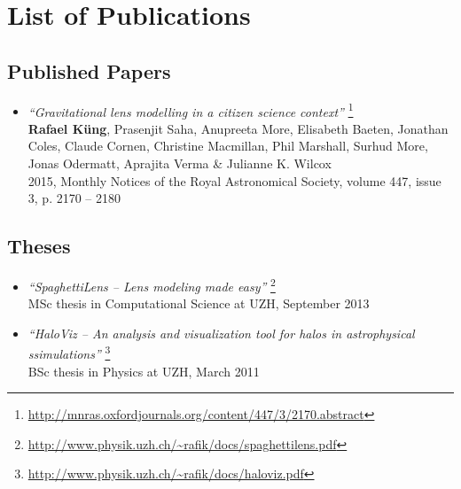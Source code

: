 \documentclass[12pt]{article}
\begin{document}
\pagestyle{empty}

\section*{List of Publications}

\subsection{Published Papers}

\begin{itemize}
\item
  \emph{``Gravitational lens modelling in a citizen science context''}
  \footnote{\url{http://mnras.oxfordjournals.org/content/447/3/2170.abstract}}\\
    {\bf Rafael Küng},
    Prasenjit Saha,
    Anupreeta More,
    Elisabeth Baeten,
    Jonathan Coles,
    Claude Cornen,
    Christine Macmillan,
    Phil Marshall,
    Surhud More,
    Jonas Odermatt,
    Aprajita Verma \&
    Julianne K. Wilcox\\    
    {\small
		2015, Monthly Notices of the Royal Astronomical Society, volume 447, issue 3, p. 2170 -- 2180
  	}

\end{itemize}


%


\subsection{Theses}

\begin{itemize}
  \item
    \emph{``SpaghettiLens -- Lens modeling made easy''}
    \footnote{\url{http://www.physik.uzh.ch/~rafik/docs/spaghettilens.pdf}}\\
    MSc thesis in Computational Science at UZH, September 2013
  \item
    \emph{``HaloViz --  An analysis and visualization tool for halos in astrophysical \\ ssimulations''}
    \footnote{\url{http://www.physik.uzh.ch/~rafik/docs/haloviz.pdf}}\\
     BSc thesis in Physics at UZH, March 2011
\end{itemize}
\end{document}
